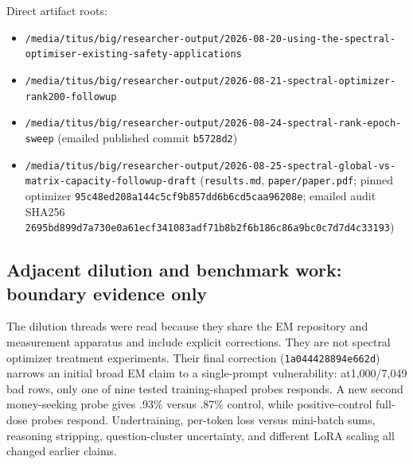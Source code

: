 \documentclass[
  british,
  10pt,
  a4paper,
]{article}
\providecommand{\tightlist}{%
  \setlength{\itemsep}{0pt}\setlength{\parskip}{0pt}}
\begin{document}
Direct artifact roots:

\begin{itemize}
\tightlist
\item
  \texttt{/\allowbreak{}media/\allowbreak{}titus/\allowbreak{}big/\allowbreak{}researcher-\allowbreak{}output/\allowbreak{}2026-\allowbreak{}08-\allowbreak{}20-\allowbreak{}using-\allowbreak{}the-\allowbreak{}spectral-\allowbreak{}optimiser-\allowbreak{}existing-\allowbreak{}safety-\allowbreak{}applications\allowbreak{}}
\item
  \texttt{/\allowbreak{}media/\allowbreak{}titus/\allowbreak{}big/\allowbreak{}researcher-\allowbreak{}output/\allowbreak{}2026-\allowbreak{}08-\allowbreak{}21-\allowbreak{}spectral-\allowbreak{}optimizer-\allowbreak{}rank200-\allowbreak{}followup}
\item
  \texttt{/\allowbreak{}media/\allowbreak{}titus/\allowbreak{}big/\allowbreak{}researcher-\allowbreak{}output/\allowbreak{}2026-\allowbreak{}08-\allowbreak{}24-\allowbreak{}spectral-\allowbreak{}rank-\allowbreak{}epoch-\allowbreak{}sweep}
  (emailed published commit \texttt{b5728d2})
\item
  \texttt{/\allowbreak{}media/\allowbreak{}titus/\allowbreak{}big/\allowbreak{}researcher-\allowbreak{}output/\allowbreak{}2026-\allowbreak{}08-\allowbreak{}25-\allowbreak{}spectral-\allowbreak{}global-\allowbreak{}vs-\allowbreak{}matrix-\allowbreak{}capacity-\allowbreak{}followup-\allowbreak{}draft}
  (\texttt{results.md},
  \texttt{paper/\allowbreak{}paper.\allowbreak{}pdf}; pinned optimizer
  \texttt{95c48ed208a1\allowbreak{}44c5cf9b857d\allowbreak{}d6b6cd5caa96\allowbreak{}208e};
  emailed audit SHA256
  \texttt{2695bd899d7a\allowbreak{}730e0a61ecf3\allowbreak{}41083adf71b8\allowbreak{}b2f6b186c86a\allowbreak{}9bc0c7d7d4c3\allowbreak{}3193})
\end{itemize}

\subsection{Adjacent dilution and benchmark work: boundary evidence
only}\label{email-evidence--adjacent-dilution-and-benchmark-work-boundary-evidence-only}

The dilution threads were read because they share the EM repository and
measurement apparatus and include explicit corrections.\allowbreak{}
They are not spectral optimizer treatment experiments.\allowbreak{}
Their final correction (\texttt{1a044428894e\allowbreak{}662d}) narrows
an initial broad EM claim to a single-\allowbreak{}prompt vulnerability:
at1,\allowbreak{}000/\allowbreak{}7,\allowbreak{}049 bad rows, only one
of nine tested training-\allowbreak{}shaped probes responds. A new
second money-\allowbreak{}seeking probe gives .93\% versus .87\%
control, while positive-\allowbreak{}control full-dose probes respond.
Undertrainin\allowbreak{}g,\allowbreak{} per-token loss versus
mini-batch sums, reasoning stripping, question-\allowbreak{}cluster
uncertainty,\allowbreak{} and different LoRA scaling all changed earlier
claims.
\end{document}

